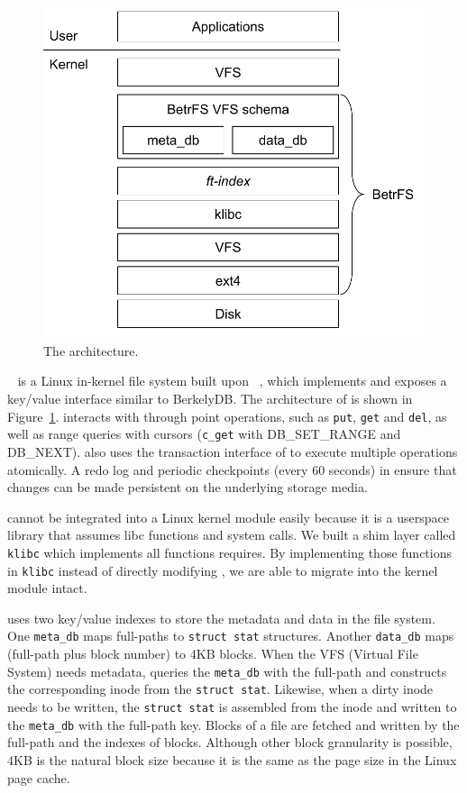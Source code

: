 \begin{figure}
    \centering
    \includegraphics{proposal/fig/betrfs}
    \caption{\label{fig:betrfs} The \betrfs architecture.}
\end{figure}

\betrfs~\citep{betrfs1,betrfs1tos} is a Linux in-kernel file
system built upon \fti~\citep{fti}, which implements \bets and exposes a
key/value interface similar to BerkelyDB.
The architecture of \betrfs is shown in Figure~\ref{fig:betrfs}.
\betrfs interacts with \fti through point operations, such as \texttt{put},
\texttt{get} and \texttt{del}, as well as range queries with cursors
(\texttt{c\_get} with DB\_SET\_RANGE and DB\_NEXT).
\betrfs also uses the transaction interface of \fti to execute multiple
operations atomically.
A redo log and periodic checkpoints (every 60 seconds) in \fti ensure that
changes can be made persistent on the underlying storage media.

\Fti cannot be integrated into a Linux kernel module easily because
it is a userspace library that assumes libc functions and system calls.
We built a shim layer called \texttt{klibc} which implements all functions \fti
requires.
By implementing those functions in \texttt{klibc} instead of directly modifying
\fti, we are able to migrate \fti into the kernel module intact.

\betrfs uses two key/value indexes to store the metadata and data in the file
system.
One \texttt{meta\_db} maps full-paths to \texttt{struct stat} structures.
Another \texttt{data\_db} maps (full-path plus block number) to 4KB blocks.
When the VFS (Virtual File System) needs metadata, \betrfs queries
the \texttt{meta\_db} with the full-path and constructs the corresponding inode
from the \texttt{struct stat}.
Likewise, when a dirty inode needs to be written, the \texttt{struct stat} is
assembled from the inode and written to the \texttt{meta\_db} with the
full-path key.
Blocks of a file are fetched and written by the full-path and the indexes of
blocks.
Although other block granularity is possible, 4KB is the natural block size
because it is the same as the page size in the Linux page cache.

